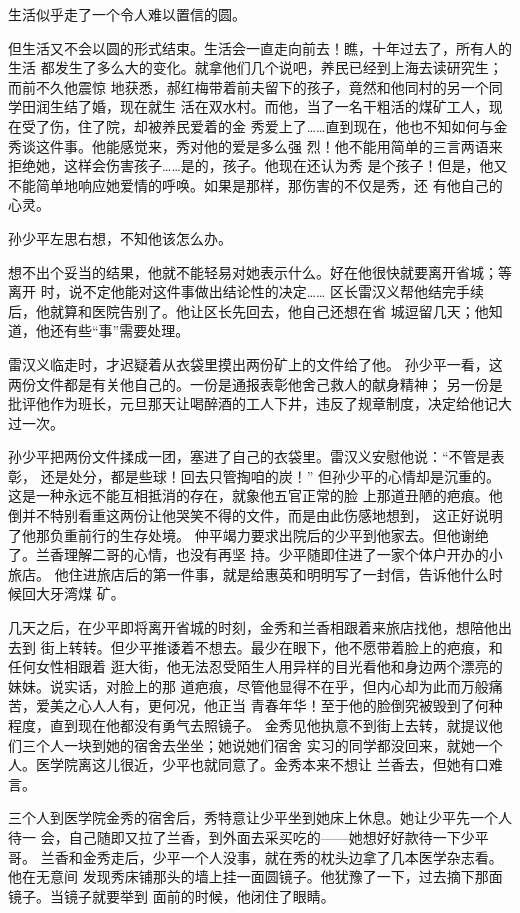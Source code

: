  生活似乎走了一个令人难以置信的圆。
 
 但生活又不会以圆的形式结束。生活会一直走向前去！瞧，十年过去了，所有人的生活
 都发生了多么大的变化。就拿他们几个说吧，养民已经到上海去读研究生；而前不久他震惊
 地获悉，郝红梅带着前夫留下的孩子，竟然和他同村的另一个同学田润生结了婚，现在就生
 活在双水村。而他，当了一名干粗活的煤矿工人，现在受了伤，住了院，却被养民爱着的金
 秀爱上了……直到现在，他也不知如何与金秀谈这件事。他能感觉来，秀对他的爱是多么强
 烈！他不能用简单的三言两语来拒绝她，这样会伤害孩子……是的，孩子。他现在还认为秀
 是个孩子！但是，他又不能简单地响应她爱情的呼唤。如果是那样，那伤害的不仅是秀，还
 有他自己的心灵。
 
 孙少平左思右想，不知他该怎么办。
 
 想不出个妥当的结果，他就不能轻易对她表示什么。好在他很快就要离开省城；等离开
 时，说不定他能对这件事做出结论性的决定……
 区长雷汉义帮他结完手续后，他就算和医院告别了。他让区长先回去，他自己还想在省
 城逗留几天；他知道，他还有些“事”需要处理。
 
 雷汉义临走时，才迟疑着从衣袋里摸出两份矿上的文件给了他。
 孙少平一看，这两份文件都是有关他自己的。一份是通报表彰他舍己救人的献身精神；
 另一份是批评他作为班长，元旦那天让喝醉酒的工人下井，违反了规章制度，决定给他记大
 过一次。
 
 孙少平把两份文件揉成一团，塞进了自己的衣袋里。雷汉义安慰他说：“不管是表彰，
 还是处分，都是些球！回去只管掏咱的炭！”
 但孙少平的心情却是沉重的。这是一种永远不能互相抵消的存在，就象他五官正常的脸
 上那道丑陋的疤痕。他倒并不特别看重这两份让他哭笑不得的文件，而是由此伤感地想到，
 这正好说明了他那负重前行的生存处境。
 仲平竭力要求出院后的少平到他家去。但他谢绝了。兰香理解二哥的心情，也没有再坚
 持。少平随即住进了一家个体户开办的小旅店。
 他住进旅店后的第一件事，就是给惠英和明明写了一封信，告诉他什么时候回大牙湾煤
 矿。
 
 几天之后，在少平即将离开省城的时刻，金秀和兰香相跟着来旅店找他，想陪他出去到
 街上转转。但少平推诿着不想去。最少在眼下，他不愿带着脸上的疤痕，和任何女性相跟着
 逛大街，他无法忍受陌生人用异样的目光看他和身边两个漂亮的妹妹。说实话，对脸上的那
 道疤痕，尽管他显得不在乎，但内心却为此而万般痛苦，爱美之心人人有，更何况，他正当
 青春年华！至于他的脸倒究被毁到了何种程度，直到现在他都没有勇气去照镜子。
 金秀见他执意不到街上去转，就提议他们三个人一块到她的宿舍去坐坐；她说她们宿舍
 实习的同学都没回来，就她一个人。医学院离这儿很近，少平也就同意了。金秀本来不想让
 兰香去，但她有口难言。
 
 三个人到医学院金秀的宿舍后，秀特意让少平坐到她床上休息。她让少平先一个人待一
 会，自己随即又拉了兰香，到外面去采买吃的——她想好好款待一下少平哥。
 兰香和金秀走后，少平一个人没事，就在秀的枕头边拿了几本医学杂志看。他在无意间
 发现秀床铺那头的墙上挂一面圆镜子。他犹豫了一下，过去摘下那面镜子。当镜子就要举到
 面前的时候，他闭住了眼睛。
 
